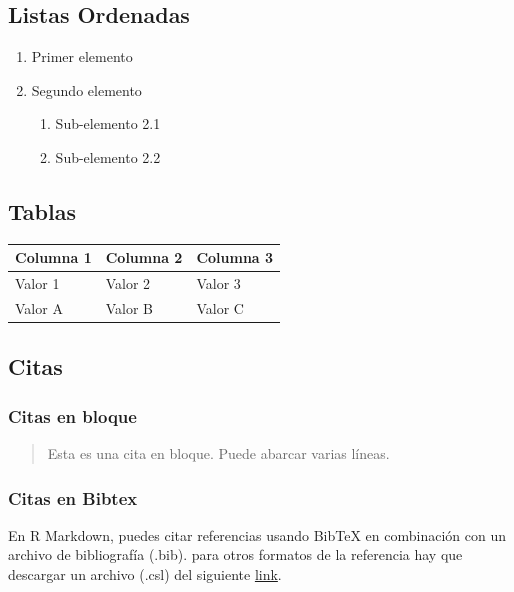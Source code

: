 \documentclass[
  10pt,
]{article}
\providecommand{\tightlist}{%
  \setlength{\itemsep}{0pt}\setlength{\parskip}{0pt}}\usepackage{longtable,booktabs,array}
\begin{document}
\subsection{Listas Ordenadas}\label{listas-ordenadas}

\begin{enumerate}
\def\labelenumi{\arabic{enumi}.}
\tightlist
\item
  Primer elemento
\item
  Segundo elemento

  \begin{enumerate}
  \def\labelenumii{\arabic{enumii}.}
  \tightlist
  \item
    Sub-elemento 2.1
  \item
    Sub-elemento 2.2
  \end{enumerate}
\end{enumerate}

\subsection{Tablas}\label{tablas}

\begin{longtable}[]{@{}lll@{}}
\toprule\noalign{}
Columna 1 & Columna 2 & Columna 3 \\
\midrule\noalign{}
\endhead
\bottomrule\noalign{}
\endlastfoot
Valor 1 & Valor 2 & Valor 3 \\
Valor A & Valor B & Valor C \\
\end{longtable}

\subsection{Citas}\label{citas}

\subsubsection{Citas en bloque}\label{citas-en-bloque}

\begin{quote}
Esta es una cita en bloque. Puede abarcar varias líneas.
\end{quote}

\subsubsection{Citas en Bibtex}\label{citas-en-bibtex}

En R Markdown, puedes citar referencias usando BibTeX en combinación con
un archivo de bibliografía (.bib). para otros formatos de la referencia
hay que descargar un archivo (.csl) del siguiente
\href{https://github.com/citation-style-language/styles}{link}.
\end{document}
